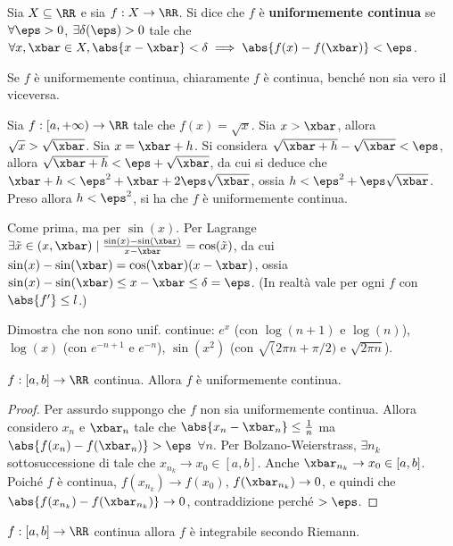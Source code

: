 \documentclass[11pt]{article}
\begin{document}
	\begin{definition} 
		Sia $X \subseteq \RR$ e sia $f : X \to \RR$. Si dice
		che $f$ è \textbf{uniformemente continua} se $\forall \eps > 0$,
		$\exists \delta(\eps) > 0$ tale che $\forall x, \xbar \in X,
		\abs{x-\xbar} < \delta \implies \abs{f(x)-f(\xbar)} < \eps$.
	\end{definition}

	\begin{remark}
		Se $f$ è uniformemente continua, chiaramente $f$ è
		continua, benché non sia vero il viceversa.
	\end{remark}

	\begin{example}
		Sia $f : [a, +\infty) \to \RR$ tale che $f(x) = \sqrt{x}$. Sia
		$x > \xbar$, allora $\sqrt{x} > \sqrt{\xbar}$. Sia
		$x = \xbar + h$. Si considera $\sqrt{\xbar + h} - \sqrt{\xbar} < \eps$,
		allora $\sqrt{\xbar + h} < \eps + \sqrt{\xbar}$, da cui si
		deduce che $\xbar + h < \eps^2 + \xbar + 2 \eps \sqrt{\xbar}$,
		ossia $h < \eps^2 + \eps \sqrt{\xbar}$. Preso allora $h < \eps^2$,
		si ha che $f$ è uniformemente continua.
	\end{example}

	\begin{example}
		Come prima, ma per $\sin(x)$. Per Lagrange $\exists \tilde x \in (x, \xbar) \mid \frac{\sin(x) - \sin(\xbar)}{x-\xbar}=\cos(\tilde x)$,
		da cui $\sin(x) - \sin(\xbar) = \cos(\xbar) (x - \xbar)$, ossia
		$\sin(x) - \sin(\xbar) \leq x - \xbar \leq \delta = \eps$.
		(In realtà vale per ogni $f$ con $\abs{f'} \leq l$.)
	\end{example}

	\begin{example}
		Dimostra che non sono unif. continue: $e^x$ (con $\log(n+1)$ e $\log(n)$), $\log(x)$ (con $e^{-n+1}$ e $e^{-n}$),
		$\sin(x^2)$ (con $\sqrt(2\pi n + \pi/2)$ e $\sqrt{2\pi n}$).
	\end{example}

	\begin{theorem}
		$f : [a, b] \to \RR$ continua. Allora $f$ è uniformemente continua.
	\end{theorem}

	\begin{proof}
		Per assurdo suppongo che $f$ non sia uniformemente continua.
		Allora considero $x_n$ e $\xbar_n$ tale che
		$\abs{x_n - \xbar_n} \leq \frac{1}{n}$ ma $\abs{f(x_n) - f(\xbar_n)} > \eps$ $\forall n$. Per Bolzano-Weierstrass, $\exists n_k$ sottosuccessione di tale che $x_{n_k} \to x_0 \in [a, b]$.
		Anche $\xbar_{n_k} \to x_0 \in [a, b]$. Poiché $f$ è continua,
		$f(x_{n_k}) \to f(x_0)$, $f(\xbar_{n_k}) \to 0$, e quindi che
		$\abs{f(x_{n_k}) - f(\xbar_{n_k})} \to 0$, contraddizione perché
		$> \eps$.
	\end{proof}

	\begin{theorem}
		$f : [a, b] \to \RR$ continua allora $f$ è integrabile
		secondo Riemann.
	\end{theorem}
	
\end{document}
